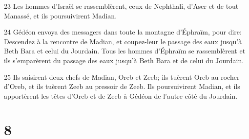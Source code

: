 \par 23 Les hommes d'Israël se rassemblèrent, ceux de Nephthali, d'Aser et de tout Manassé, et ils poursuivirent Madian.
\par 24 Gédéon envoya des messagers dans toute la montagne d'Éphraïm, pour dire: Descendez à la rencontre de Madian, et coupez-leur le passage des eaux jusqu'à Beth Bara et celui du Jourdain. Tous les hommes d'Éphraïm se rassemblèrent et ils s'emparèrent du passage des eaux jusqu'à Beth Bara et de celui du Jourdain.
\par 25 Ils saisirent deux chefs de Madian, Oreb et Zeeb; ils tuèrent Oreb au rocher d'Oreb, et ils tuèrent Zeeb au pressoir de Zeeb. Ils poursuivirent Madian, et ils apportèrent les têtes d'Oreb et de Zeeb à Gédéon de l'autre côté du Jourdain.

\chapter{8}

